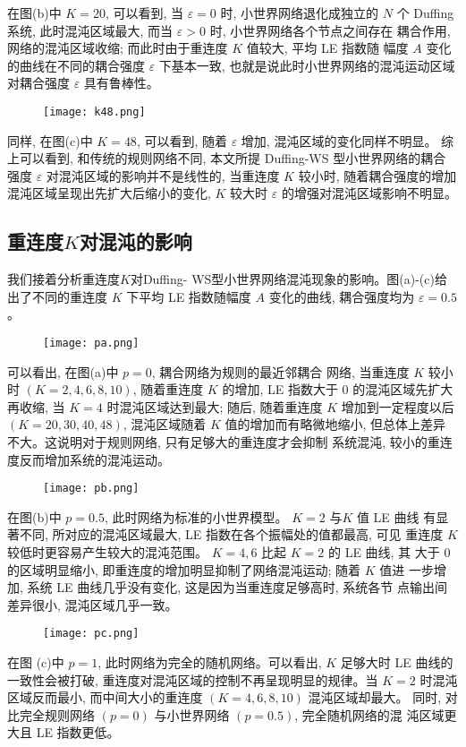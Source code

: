 在图(b)中 $K=20$, 可以看到, 当 $\varepsilon=0$ 时, 小世界网络退化成独立的 $N$ 个 Duffing系统, 此时混沌区域最大,
而当 $\varepsilon>0$ 时, 小世界网络各个节点之间存在 耦合作用, 网络的混沌区域收缩; 而此时由于重连度 $K$ 值较大, 平均 LE 指数随
幅度 $A$ 变化的曲线在不同的耦合强度 $\varepsilon$ 下基本一致, 也就是说此时小世界网络的混沌运动区域对耦合强度
$\varepsilon$ 具有鲁棒性。\par
\begin{figure}[!htbp]
    \centering
    \texttt{[image: k48.png]}
\end{figure}
同样, 在图(c)中 $K=48$, 可以看到, 随着 $\varepsilon$ 增加, 混沌区域的变化同样不明显。
综上可以看到, 和传统的规则网络不同, 本文所提 Duffing-WS 型小世界网络的耦合强度 $\varepsilon$
对混沌区域的影响并不是线性的, 当重连度 $K$ 较小时, 随着耦合强度的增加混沌区域呈现出先扩大后缩小的变化,
$K$ 较大时 $\varepsilon$ 的增强对混沌区域影响不明显。


\subsection*{重连度$K$对混沌的影响}
我们接着分析重连度$K$对Duffing- WS型小世界网络混沌现象的影响。图(a)-(c)给出了不同的重连度 $K$ 下平均 LE 指数随幅度 $A$ 变化的曲线, 耦合强度均为 $\varepsilon=0.5$ 。\par
\begin{figure}[!htbp]
    \centering
    \texttt{[image: pa.png]}
\end{figure}
可以看出, 在图(a)中 $p=0$, 耦合网络为规则的最近邻耦合 网络, 当重连度 $K$ 较小时 $(K=2,4,6,8,10)$,
随着重连度 $K$ 的增加, LE 指数大于 0 的混沌区域先扩大再收缩, 当 $K=4$ 时混沌区域达到最大; 随后,
随着重连度 $K$ 增加到一定程度以后 $(K=20,30,40,48)$, 混沌区域随着 $K$ 值的增加而有略微地缩小,
但总体上差异不大。这说明对于规则网络, 只有足够大的重连度才会抑制 系统混沌, 较小的重连度反而增加系统的混沌运动。\par
\begin{figure}[!htbp]
    \centering
    \texttt{[image: pb.png]}
\end{figure}
在图(b)中 $p=0.5$, 此时网络为标准的小世界模型。 $K=2$ 与$K$ 值 LE 曲线 有显著不同, 所对应的混沌区域最大,
LE 指数在各个振幅处的值都最高, 可见 重连度 $K$ 较低时更容易产生较大的混沌范围。 $K=4,6$ 比起 $K=2$ 的 LE 曲线, 其
大于 0 的区域明显缩小, 即重连度的增加明显抑制了网络混沌运动; 随着 $K$ 值进 一步增加, 系统 LE 曲线几乎没有变化,
这是因为当重连度足够高时, 系统各节 点输出间差异很小, 混沌区域几乎一致。\par
\begin{figure}[!htbp]
    \centering
    \texttt{[image: pc.png]}
\end{figure}
在图 (c)中 $p=1$, 此时网络为完全的随机网络。可以看出, $K$ 足够大时 LE 曲线的一致性会被打破,
重连度对混沌区域的控制不再呈现明显的规律。当 $K=2$ 时混沌区域反而最小, 而中间大小的重连度 $(K=4,6,8,10)$ 混沌区域却最大。
同时, 对比完全规则网络 $(p=0)$ 与小世界网络 $(p=0.5)$, 完全随机网络的混 沌区域更大且 LE 指数更低。

